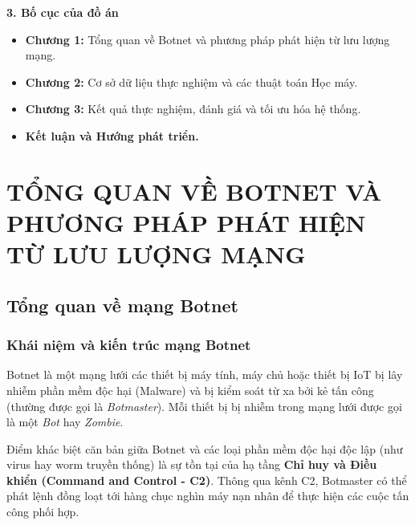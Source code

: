 \documentclass[12pt,a4paper,oneside]{report}
\begin{document}
\textbf{3. Bố cục của đồ án}
\begin{itemize}
  \item \textbf{Chương 1:} Tổng quan về Botnet và phương pháp phát hiện từ lưu lượng mạng.
  \item \textbf{Chương 2:} Cơ sở dữ liệu thực nghiệm và các thuật toán Học máy.
  \item \textbf{Chương 3:} Kết quả thực nghiệm, đánh giá và tối ưu hóa hệ thống.
  \item \textbf{Kết luận và Hướng phát triển.}
\end{itemize}

\chapter{TỔNG QUAN VỀ BOTNET VÀ PHƯƠNG PHÁP PHÁT HIỆN TỪ LƯU LƯỢNG MẠNG}

\section{Tổng quan về mạng Botnet}
\subsection{Khái niệm và kiến trúc mạng Botnet}
Botnet là một mạng lưới các thiết bị máy tính, máy chủ hoặc thiết bị IoT bị lây nhiễm phần mềm độc hại (Malware) và bị kiểm soát từ xa bởi kẻ tấn công (thường được gọi là \textit{Botmaster}). Mỗi thiết bị bị nhiễm trong mạng lưới được gọi là một \textit{Bot} hay \textit{Zombie}.

Điểm khác biệt căn bản giữa Botnet và các loại phần mềm độc hại độc lập (như virus hay worm truyền thống) là sự tồn tại của hạ tầng \textbf{Chỉ huy và Điều khiển (Command and Control - C2)}. Thông qua kênh C2, Botmaster có thể phát lệnh đồng loạt tới hàng chục nghìn máy nạn nhân để thực hiện các cuộc tấn công phối hợp.
\end{document}
